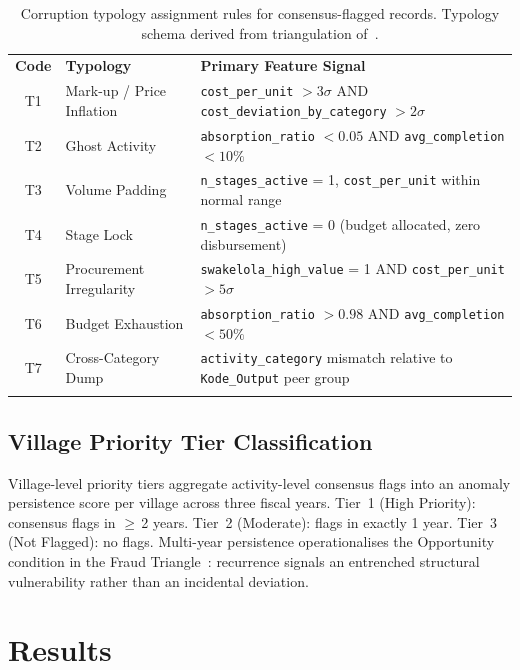 \documentclass[3p,times,procedia]{elsarticle}
\begin{document}
\begin{table}[htb]
\caption{Corruption typology assignment rules for consensus-flagged records. Typology schema derived from triangulation of~\cite{ref12,ref13,ref14}.}
\label{tab:typo_rules}
\begin{tabular*}{\hsize}{@{\extracolsep{\fill}}cll@{}}
\toprule
\textbf{Code} & \textbf{Typology} & \textbf{Primary Feature Signal} \\
\colrule
T1 & Mark-up / Price Inflation   & \texttt{cost\_per\_unit} $> 3\sigma$ AND \texttt{cost\_deviation\_by\_category} $> 2\sigma$ \\
T2 & Ghost Activity              & \texttt{absorption\_ratio} $< 0.05$ AND \texttt{avg\_completion} $< 10\%$ \\
T3 & Volume Padding              & \texttt{n\_stages\_active} = 1, \texttt{cost\_per\_unit} within normal range \\
T4 & Stage Lock                  & \texttt{n\_stages\_active} = 0 (budget allocated, zero disbursement) \\
T5 & Procurement Irregularity    & \texttt{swakelola\_high\_value} = 1 AND \texttt{cost\_per\_unit} $> 5\sigma$ \\
T6 & Budget Exhaustion           & \texttt{absorption\_ratio} $> 0.98$ AND \texttt{avg\_completion} $< 50\%$ \\
T7 & Cross-Category Dump         & \texttt{activity\_category} mismatch relative to \texttt{Kode\_Output} peer group \\
\botrule
\end{tabular*}
\end{table}

\subsection{Village Priority Tier Classification}

Village-level priority tiers aggregate activity-level consensus flags into an anomaly persistence score per village across three fiscal years. Tier~1 (High Priority): consensus flags in $\geq$\,2 years. Tier~2 (Moderate): flags in exactly 1 year. Tier~3 (Not Flagged): no flags. Multi-year persistence operationalises the Opportunity condition in the Fraud Triangle~\cite{ref21}: recurrence signals an entrenched structural vulnerability rather than an incidental deviation.

\section{Results}
\label{sec:results}
\end{document}
